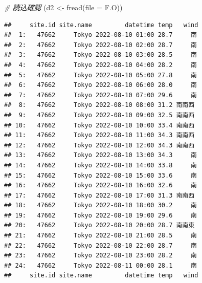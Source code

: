 \documentclass[
]{article}
\newenvironment{Shaded}{\begin{snugshade}}{\end{snugshade}}
\newcommand{\AttributeTok}[1]{\textcolor[rgb]{0.77,0.63,0.00}{#1}}
\newcommand{\CommentTok}[1]{\textcolor[rgb]{0.56,0.35,0.01}{\textit{#1}}}
\newcommand{\FunctionTok}[1]{\textcolor[rgb]{0.00,0.00,0.00}{#1}}
\newcommand{\NormalTok}[1]{#1}
\newcommand{\OtherTok}[1]{\textcolor[rgb]{0.56,0.35,0.01}{#1}}
\begin{document}
\begin{Shaded}
\begin{Highlighting}[]
\CommentTok{\# 読込確認}
\NormalTok{(d2 }\OtherTok{\textless{}{-}} \FunctionTok{fread}\NormalTok{(}\AttributeTok{file =}\NormalTok{ F.O))}
\end{Highlighting}
\end{Shaded}

\begin{verbatim}
##     site.id site.name         datetime temp   wind
##  1:   47662     Tokyo 2022-08-10 01:00 28.7     南
##  2:   47662     Tokyo 2022-08-10 02:00 28.7     南
##  3:   47662     Tokyo 2022-08-10 03:00 28.5     南
##  4:   47662     Tokyo 2022-08-10 04:00 28.2     南
##  5:   47662     Tokyo 2022-08-10 05:00 27.8     南
##  6:   47662     Tokyo 2022-08-10 06:00 28.0     南
##  7:   47662     Tokyo 2022-08-10 07:00 29.6     南
##  8:   47662     Tokyo 2022-08-10 08:00 31.2 南南西
##  9:   47662     Tokyo 2022-08-10 09:00 32.5 南南西
## 10:   47662     Tokyo 2022-08-10 10:00 33.4 南南西
## 11:   47662     Tokyo 2022-08-10 11:00 34.3 南南西
## 12:   47662     Tokyo 2022-08-10 12:00 34.3 南南西
## 13:   47662     Tokyo 2022-08-10 13:00 34.3     南
## 14:   47662     Tokyo 2022-08-10 14:00 33.8     南
## 15:   47662     Tokyo 2022-08-10 15:00 33.6     南
## 16:   47662     Tokyo 2022-08-10 16:00 32.6     南
## 17:   47662     Tokyo 2022-08-10 17:00 31.3 南南西
## 18:   47662     Tokyo 2022-08-10 18:00 30.2     南
## 19:   47662     Tokyo 2022-08-10 19:00 29.6     南
## 20:   47662     Tokyo 2022-08-10 20:00 28.7 南南東
## 21:   47662     Tokyo 2022-08-10 21:00 28.5     南
## 22:   47662     Tokyo 2022-08-10 22:00 28.7     南
## 23:   47662     Tokyo 2022-08-10 23:00 28.2     南
## 24:   47662     Tokyo 2022-08-11 00:00 28.1     南
##     site.id site.name         datetime temp   wind
\end{verbatim}
\end{document}

